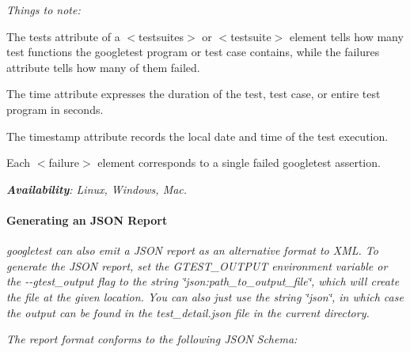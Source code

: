 {\itshape Things to note\+:}

{\itshape 
\begin{DoxyItemize}
\item The {\ttfamily tests} attribute of a {\ttfamily $<$testsuites$>$} or {\ttfamily $<$testsuite$>$} element tells how many test functions the googletest program or test case contains, while the {\ttfamily failures} attribute tells how many of them failed.
\item The {\ttfamily time} attribute expresses the duration of the test, test case, or entire test program in seconds.
\item The {\ttfamily timestamp} attribute records the local date and time of the test execution.
\item Each {\ttfamily $<$failure$>$} element corresponds to a single failed googletest assertion.
\end{DoxyItemize}}

{\itshape {\bfseries Availability}\+: Linux, Windows, Mac.}

{\itshape \paragraph*{Generating an J\+S\+ON Report}}

{\itshape }

{\itshape googletest can also emit a J\+S\+ON report as an alternative format to X\+ML. To generate the J\+S\+ON report, set the {\ttfamily G\+T\+E\+S\+T\+\_\+\+O\+U\+T\+P\+UT} environment variable or the {\ttfamily -\/-\/gtest\+\_\+output} flag to the string {\ttfamily \char`\"{}json\+:path\+\_\+to\+\_\+output\+\_\+file\char`\"{}}, which will create the file at the given location. You can also just use the string {\ttfamily \char`\"{}json\char`\"{}}, in which case the output can be found in the {\ttfamily test\+\_\+detail.\+json} file in the current directory.}

{\itshape The report format conforms to the following J\+S\+ON Schema\+:}

